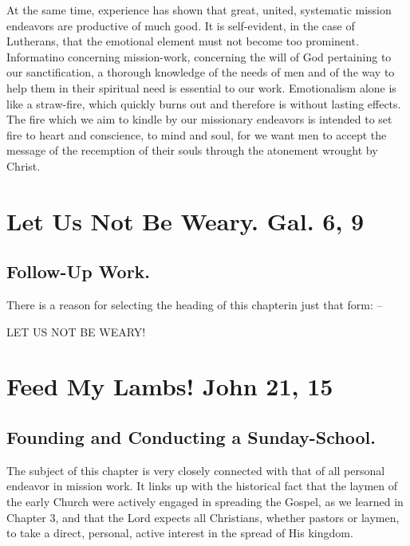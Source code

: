 \documentclass[
]{book}
\begin{document}
At the same time, experience has shown that great, united, systematic mission endeavors are productive of much good. It is self-evident, in the case of Lutherans, that the emotional element must not become too prominent. Informatino concerning mission-work, concerning the will of God pertaining to our sanctification, a thorough knowledge of the needs of men and of the way to help them in their spiritual need is essential to our work. Emotionalism alone is like a straw-fire, which quickly burns out and therefore is without lasting effects. The fire which we aim to kindle by our missionary endeavors is intended to set fire to heart and conscience, to mind and soul, for we want men to accept the message of the recemption of their souls through the atonement wrought by Christ.

\hypertarget{let-us-not-be-weary.-gal.-6-9}{%
\chapter{Let Us Not Be Weary. Gal. 6, 9}\label{let-us-not-be-weary.-gal.-6-9}}

\hypertarget{follow-up-work.}{%
\section*{Follow-Up Work.}\label{follow-up-work.}}

There is a reason for selecting the heading of this chapterin just that form: --

LET US NOT BE WEARY!

\hypertarget{feed-my-lambs-john-21-15}{%
\chapter{Feed My Lambs! John 21, 15}\label{feed-my-lambs-john-21-15}}

\hypertarget{founding-and-conducting-a-sunday-school.}{%
\section*{Founding and Conducting a Sunday-School.}\label{founding-and-conducting-a-sunday-school.}}

The subject of this chapter is very closely connected with that of all personal endeavor in mission work. It links up with the historical fact that the laymen of the early Church were actively engaged in spreading the Gospel, as we learned in Chapter 3, and that the Lord expects all Christians, whether pastors or laymen, to take a direct, personal, active interest in the spread of His kingdom.
\end{document}
